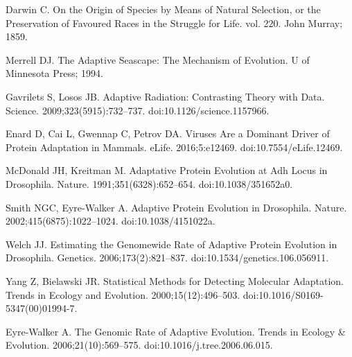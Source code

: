 \documentclass[10pt,letterpaper]{article}
\providecommand{\DIFaddend}{} %
\DeclareRobustCommand{\DIFaddend}{\DIFOaddend \let\includegraphics\DIFOincludegraphics} %
\begin{document}
\DIFaddend %
%
%
%
\begin{thebibliography}{10}

Darwin C.
\newblock On the {{Origin}} of {{Species}} by {{Means}} of {{Natural
Selection}}, or the {{Preservation}} of {{Favoured Races}} in the
{{Struggle}} for {{Life}}. vol. 220.
\newblock John Murray; 1859.

Merrell DJ.
\newblock The {{Adaptive Seascape}}: {{The Mechanism}} of {{Evolution}}.
\newblock U of Minnesota Press; 1994.

Gavrilets S, Losos JB.
\newblock Adaptive {{Radiation}}: {{Contrasting Theory}} with {{Data}}.
\newblock Science. 2009;323(5915):732--737.
\newblock doi:{10.1126/science.1157966}.

Enard D, Cai L, Gwennap C, Petrov DA.
\newblock Viruses Are a Dominant Driver of Protein Adaptation in Mammals.
\newblock eLife. 2016;5:e12469.
\newblock doi:{10.7554/eLife.12469}.

McDonald JH, Kreitman M.
\newblock Adaptative Protein Evolution at {{Adh}} Locus in {{Drosophila}}.
\newblock Nature. 1991;351(6328):652--654.
\newblock doi:{10.1038/351652a0}.

Smith NGC, {Eyre-Walker} A.
\newblock Adaptive Protein Evolution in {{Drosophila}}.
\newblock Nature. 2002;415(6875):1022--1024.
\newblock doi:{10.1038/4151022a}.

Welch JJ.
\newblock Estimating the {{Genomewide Rate}} of {{Adaptive Protein Evolution}}
in {{Drosophila}}.
\newblock Genetics. 2006;173(2):821--837.
\newblock doi:{10.1534/genetics.106.056911}.

Yang Z, Bielawski JR.
\newblock Statistical Methods for Detecting Molecular Adaptation.
\newblock Trends in Ecology and Evolution. 2000;15(12):496--503.
\newblock doi:{10.1016/S0169-5347(00)01994-7}.

{Eyre-Walker} A.
\newblock The Genomic Rate of Adaptive Evolution.
\newblock Trends in Ecology \& Evolution. 2006;21(10):569--575.
\newblock doi:{10.1016/j.tree.2006.06.015}.


\end{thebibliography}
\end{document}
